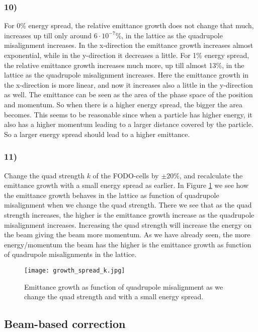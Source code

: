 \documentclass[12pt,a4paper,english]{article}
\begin{document}
\subsubsection*{10)}
For 0\% energy spread, the relative emittance growth does not change that much, increases up till only around $6\cdot10^{-7}$\%, in the lattice as the quadrupole misalignment increases. In the x-direction the emittance growth increases almost exponential, while in the y-direction it decreases a little. For 1\% energy spread, the relative emittance growth increases much more, up till almost 13\%, in the lattice as the quadrupole misalignment increases. Here the emittance growth in the x-direction is more linear, and now it increases also a little in the y-direction as well. The emittance can be seen as the area of the phase space of the position and momentum. So when there is a higher energy spread, the bigger the area becomes. This seems to be reasonable since when a particle has higher energy, it also has a higher momentum leading to a larger distance covered by the particle. So a larger energy spread should lead to a higher emittance.	

\subsubsection*{11)}
Change the quad strength $k$ of the FODO-cells by $\pm20$\%, and recalculate the emittance growth with a small energy spread as earlier. In Figure \ref{fig:quad_strength} we see how the emittance growth behaves in the lattice as function of quadrupole misalignment when we change the quad strength. There we see that as the quad strength increases, the higher is the emittance growth increase as the quadrupole misalignment increases. Increasing the quad strength will increase the energy on the beam giving the beam more momentum. As we have already seen, the more energy/momentum the beam has the higher is the emittance growth as function of quadrupole misalignments in the lattice.

\begin{figure}[htbp!]
	\centering\texttt{[image: growth\_spread\_k.jpg]}
	\caption{Emittance growth as function of quadrupole misalignment as we change the quad strength and with a small energy spread. \label{fig:quad_strength}}
\end{figure} 

\subsection*{Beam-based correction}
\label{subsect:Beam correction}
\end{document}
